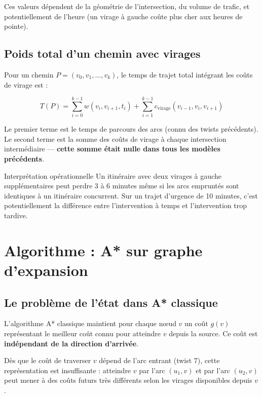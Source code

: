 \documentclass[12pt,a4paper]{article}
\theoremstyle{definition}
\theoremstyle{remark}
\begin{document}
Ces valeurs dépendent de la géométrie de l'intersection, du volume
de trafic, et potentiellement de l'heure (un virage à gauche coûte
plus cher aux heures de pointe).

\subsection{Poids total d'un chemin avec virages}

Pour un chemin $P = (v_0, v_1, \ldots, v_k)$, le temps de trajet
total intégrant les coûts de virage est :

\[
  T(P) = \sum_{i=0}^{k-1} w(v_i, v_{i+1}, t_i)
       + \sum_{i=1}^{k-1} c_\text{virage}(v_{i-1}, v_i, v_{i+1})
\]

Le premier terme est le temps de parcours des arcs (connu des twists
précédents). Le second terme est la somme des coûts de virage à chaque
intersection intermédiaire — \textbf{cette somme était nulle dans tous
les modèles précédents}.

\begin{metierbox}{Interprétation opérationnelle}
Un itinéraire avec deux virages à gauche supplémentaires peut perdre
3 à 6 minutes même si les arcs empruntés sont identiques à un
itinéraire concurrent. Sur un trajet d'urgence de 10 minutes,
c'est potentiellement la différence entre l'intervention à temps
et l'intervention trop tardive.
\end{metierbox}

\newpage

\section{Algorithme : A* sur graphe d'expansion}

\subsection{Le problème de l'état dans A* classique}

L'algorithme A* classique maintient pour chaque nœud $v$ un coût
$g(v)$ représentant le meilleur coût connu pour atteindre $v$ depuis
la source. Ce coût est \textbf{indépendant de la direction d'arrivée}.

Dès que le coût de traverser $v$ dépend de l'arc entrant (twist 7),
cette représentation est insuffisante : atteindre $v$ par l'arc
$(u_1, v)$ et par l'arc $(u_2, v)$ peut mener à des coûts futurs
très différents selon les virages disponibles depuis $v$.
\end{document}
